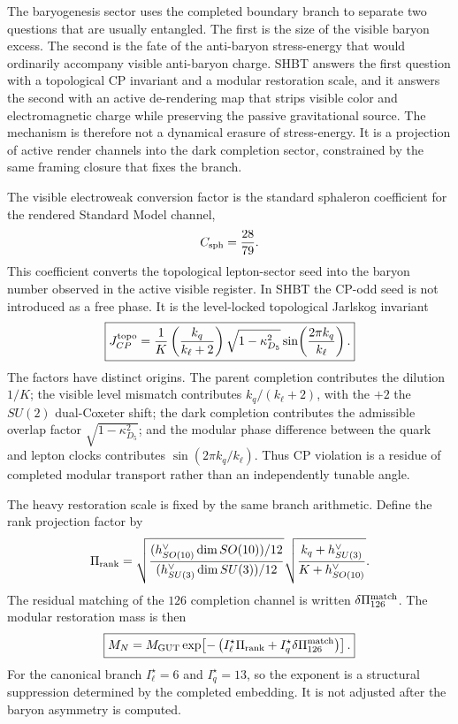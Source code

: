 \documentclass[11pt]{article}
\newcommand{\kell}{k_{\ell}}
\newcommand{\kq}{k_q}
\newcommand{\Kpar}{K}
\newcommand{\kappad}{\kappa_{D_5}}
\begin{document}
The baryogenesis sector uses the completed boundary branch to separate two
questions that are usually entangled.  The first is the size of the visible
baryon excess.  The second is the fate of the anti-baryon stress-energy that
would ordinarily accompany visible anti-baryon charge.  SHBT answers the first
question with a topological CP invariant and a modular restoration scale, and it
answers the second with an active de-rendering map that strips visible color and
electromagnetic charge while preserving the passive gravitational source.  The
mechanism is therefore not a dynamical erasure of stress-energy.  It is a
projection of active render channels into the dark completion sector, constrained
by the same framing closure that fixes the branch.

The visible electroweak conversion factor is the standard sphaleron coefficient
for the rendered Standard Model channel,
\begin{equation}
\label{eq:section-six-sphaleron-coefficient}
 C_{\rm sph}
 =
 \frac{28}{79}.
\end{equation}
This coefficient converts the topological lepton-sector seed into the baryon
number observed in the active visible register.  In SHBT the CP-odd seed is not
introduced as a free phase.  It is the level-locked topological Jarlskog
invariant
\begin{equation}
\label{eq:section-six-topological-jarlskog}
 \boxed{
 J_{CP}^{\rm topo}
 =
 \frac{1}{\Kpar}
 \left(\frac{\kq}{\kell+2}\right)
 \sqrt{1-\kappad^{2}}
 \sin\!\left(\frac{2\pi\kq}{\kell}\right).
 }
\end{equation}
The factors have distinct origins.  The parent completion contributes the
dilution $1/\Kpar$; the visible level mismatch contributes
$\kq/(\kell+2)$, with the $+2$ the $SU(2)$ dual-Coxeter shift; the dark
completion contributes the admissible overlap factor
$\sqrt{1-\kappad^{2}}$; and the modular phase difference between the quark
and lepton clocks contributes $\sin(2\pi\kq/\kell)$.  Thus CP violation is a
residue of completed modular transport rather than an independently tunable
angle.

The heavy restoration scale is fixed by the same branch arithmetic.  Define the
rank projection factor by
\begin{equation}
\label{eq:section-six-rank-projection-factor}
 \Pi_{\rm rank}
 =
 \sqrt{
 \frac{(h^{\vee}_{SO(10)}\dim SO(10))/12}
 {(h^{\vee}_{SU(3)}\dim SU(3))/12}}
 \sqrt{\frac{\kq+h^{\vee}_{SU(3)}}{\Kpar+h^{\vee}_{SO(10)}}}.
\end{equation}
The residual matching of the $126$ completion channel is written
$\delta\Pi_{126}^{\rm match}$.  The modular restoration mass is then
\begin{equation}
\label{eq:section-six-modular-restoration-scale}
 \boxed{
 M_N
 =
 M_{\rm GUT}
 \exp\!\left[-\left(
 I_{\ell}^{\star}\Pi_{\rm rank}
 +
 I_q^{\star}\delta\Pi_{126}^{\rm match}
 \right)\right].
 }
\end{equation}
For the canonical branch $I_{\ell}^{\star}=6$ and $I_q^{\star}=13$, so the
exponent is a structural suppression determined by the completed embedding.  It
is not adjusted after the baryon asymmetry is computed.
\end{document}
